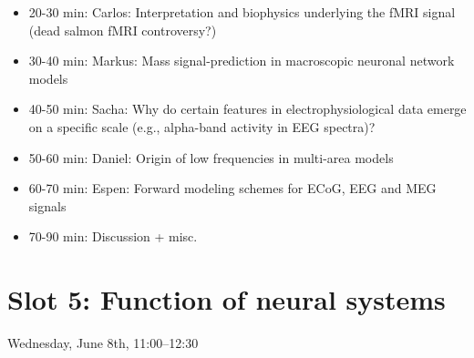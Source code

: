 \documentclass[10pt, a4paper,twoside,american]{article}
\begin{document}
\begin{enumerate}[resume]
\begin{itemize}
  \item 20-30 min: Carlos: Interpretation and biophysics underlying the fMRI signal (dead salmon fMRI controversy?) 
  \item 30-40 min: Markus: Mass signal-prediction in macroscopic neuronal network models
  \item 40-50 min: Sacha: Why do certain features in electrophysiological data emerge on a specific scale (e.g., alpha-band activity in EEG spectra)?
  \item 50-60 min: Daniel: Origin of low frequencies in multi-area models
  \item 60-70 min: Espen: Forward modeling schemes for ECoG, EEG and MEG signals
  \item 70-90 min: Discussion + misc.
  \end{itemize}
\end{enumerate}

\section*{Slot 5: Function of neural systems}
Wednesday, June 8th, 11:00--12:30
\end{document}
